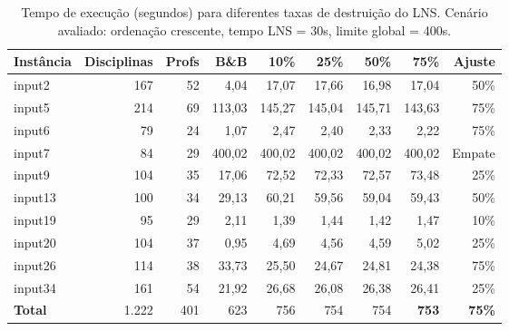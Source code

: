 \begin{table}[htbp]
\centering
\caption{Tempo de execução (segundos) para diferentes taxas de destruição do LNS. Cenário avaliado: ordenação crescente, tempo LNS = 30s, limite global = 400s.}
\label{tab:lns_cand_tempo}
\small
\begin{tabular}{@{}lrrrrrrrr@{}}
\toprule
\textbf{Instância} & \textbf{Disciplinas} & \textbf{Profs} & \textbf{B\&B} & \textbf{10\%} & \textbf{25\%} & \textbf{50\%} & \textbf{75\%} & \textbf{Ajuste} \\
\midrule
input2  & 167 & 52 & 4,04    & 17,07  & 17,66  & 16,98  & 17,04  & 50\% \\
input5  & 214 & 69 & 113,03  & 145,27 & 145,04 & 145,71 & 143,63 & 75\% \\
input6  & 79  & 24 & 1,07    & 2,47   & 2,40   & 2,33   & 2,22   & 75\% \\
input7  & 84  & 29 & 400,02  & 400,02 & 400,02 & 400,02 & 400,02 & Empate \\
input9  & 104 & 35 & 17,06   & 72,52  & 72,33  & 72,57  & 73,48  & 25\% \\
input13 & 100 & 34 & 29,13   & 60,21  & 59,56  & 59,04  & 59,43  & 50\% \\
input19 & 95  & 29 & 2,11    & 1,39   & 1,44   & 1,42   & 1,47   & 10\% \\
input20 & 104 & 37 & 0,95    & 4,69   & 4,56   & 4,59   & 5,02   & 25\% \\
input26 & 114 & 38 & 33,73   & 25,50  & 24,67  & 24,81  & 24,38  & 75\% \\
input34 & 161 & 54 & 21,92   & 26,68  & 26,08  & 26,38  & 26,41  & 25\% \\
\midrule
\textbf{Total}  & 1.222 & 401 & 623 & 756 & 754 & 754 & \textbf{753} & \textbf{75\%} \\
\bottomrule
\end{tabular}
\end{table}
